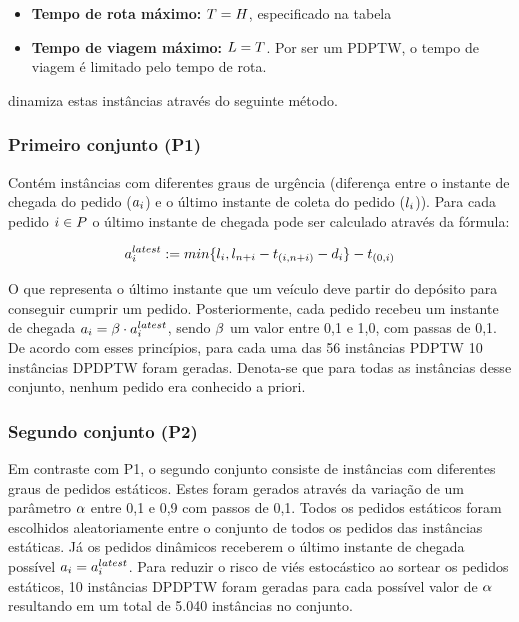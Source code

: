 \documentclass{anpet}
\begin{document}
\begin{itemize}
\begin{itemize}
    \end{itemize}
    \item \textbf{Tempo de rota máximo:} $T = H$, especificado na tabela
    \item \textbf{Tempo de viagem máximo:} $L = T$. Por ser um PDPTW, o tempo de viagem é limitado pelo tempo de rota.
\end{itemize}



\textcite{pankratz_dynamic_2005} dinamiza estas instâncias através do seguinte método.

\subsubsection{Primeiro conjunto (P1)}
Contém instâncias com diferentes graus de urgência (diferença entre o instante de chegada do pedido ($a_i$) e o último instante de coleta do pedido ($l_i{}$)). Para cada pedido $i{} \in P$ o último instante de chegada pode ser calculado através da fórmula:

\begin{equation}
    a{}_{i{}}^{latest} := min\{l_i{}, l_{n{} + i{}} - t_{(i{},{n{} + i{}})} - d_i{}\} - t_{(0,i{})}
    \label{eq:pankratz_dynamic_2005_requestLatestArrivalTime}
\end{equation}

O que representa o último instante que um veículo deve partir do depósito para conseguir cumprir um pedido. Posteriormente, cada pedido recebeu um instante de chegada $a_i = \beta \cdot a{}_{i{}}^{latest}$, sendo $\beta$ um valor entre 0,1 e 1,0, com passas de 0,1. De acordo com esses princípios, para cada uma das 56 instâncias PDPTW 10 instâncias DPDPTW foram geradas. Denota-se que para todas as instâncias desse conjunto, nenhum pedido era conhecido a priori.

\subsubsection{Segundo conjunto (P2)}
Em contraste com P1, o segundo conjunto consiste de instâncias com diferentes graus de pedidos estáticos. Estes foram gerados através da variação de um parâmetro $\alpha$ entre 0,1 e 0,9 com passos de 0,1. Todos os pedidos estáticos foram escolhidos aleatoriamente entre o conjunto de todos os pedidos das instâncias estáticas. Já os pedidos dinâmicos receberem o último instante de chegada possível $a_i = a{}_{i{}}^{latest}$. Para reduzir o risco de viés estocástico ao sortear os pedidos estáticos, 10 instâncias DPDPTW foram geradas para cada possível valor de $\alpha$ resultando em um total de 5.040 instâncias no conjunto.



\printbibliography
\end{document}
